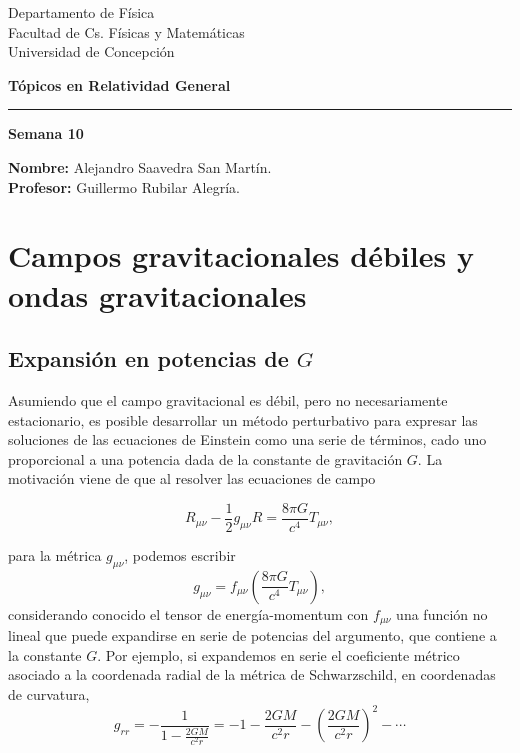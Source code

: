 \documentclass[letterpaper,11pt]{article}
\begin{document}
\pagestyle{plain}

\begin{flushleft}\vspace{-2cm}
Departamento de Física \\
Facultad de Cs. Físicas y Matemáticas\\
Universidad de Concepción
\end{flushleft}

\begin{flushright}\vspace{-1.5cm}
\textbf{Tópicos en Relatividad General} 
\end{flushright}



\rule{\linewidth}{0.1mm}

\begin{center}
\textbf{\LARGE Semana 10}
\end{center}

\begin{flushleft}
\textbf{Nombre:} Alejandro Saavedra San Martín. \\
\textbf{Profesor:} Guillermo Rubilar Alegría.
\end{flushleft}

\section*{Campos gravitacionales débiles y ondas gravitacionales}

\subsection*{Expansión en potencias de $G$}

Asumiendo que el campo gravitacional es débil, pero no necesariamente estacionario, es posible desarrollar un método perturbativo para expresar las soluciones de las ecuaciones de Einstein como una serie de términos, cado uno proporcional a una potencia dada de la constante de gravitación $G$. La motivación viene de que al resolver las ecuaciones de campo
\begin{shaded}
\begin{equation}
R_{\mu\nu} - \frac{1}{2} g_{\mu\nu} R = \frac{8\pi G}{c^4} T_{\mu\nu},
\end{equation}
\end{shaded}
para la métrica $g_{\mu\nu}$, podemos escribir
\begin{equation}
g_{\mu\nu} = f_{\mu\nu} \left(  \frac{8\pi G}{c^4} T_{\mu\nu} \right),
\end{equation}
considerando conocido el tensor de energía-momentum con $f_{\mu\nu}$  una función no lineal que puede expandirse en serie de potencias del argumento, que contiene a la constante $G$. Por ejemplo, si expandemos en serie el coeficiente métrico asociado a la coordenada radial de la métrica de Schwarzschild, en coordenadas de curvatura,
\begin{equation}
g_{rr} = - \frac{1}{1 - \frac{2GM}{c^2r}} = - 1 -  \frac{2GM}{c^2r} -  \left(\frac{2GM}{c^2r}\right)^2 - \cdots
\end{equation}
\end{document}
